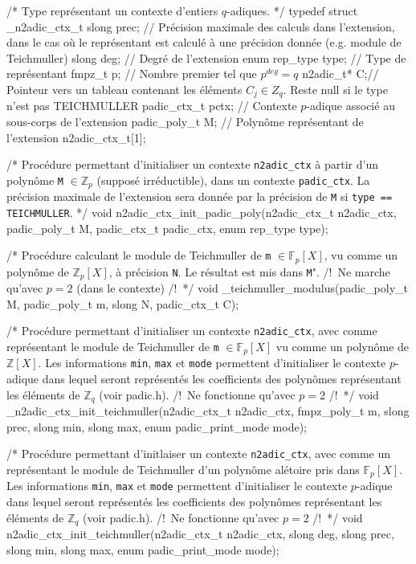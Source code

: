 \documentclass[11pt]{article}
\begin{document}
/* Type représentant un contexte d'entiers $q$-adiques. */
typedef struct _n2adic_ctx_t
{
    slong prec; // Précision maximale des calculs dans l'extension, dans le cas où le représentant est calculé à une précision donnée (e.g. module de Teichmuller)
    slong deg; // Degré de l'extension
    enum rep_type type; // Type de représentant
    fmpz_t p; // Nombre premier tel que $p^{deg} = q$
    n2adic_t* C;// Pointeur vers un tableau contenant les éléments $C_j \in Z_q$. Reste null si le type n'est pas TEICHMULLER
    padic_ctx_t pctx; // Contexte $p$-adique associé au sous-corps de l'extension
    padic_poly_t M; // Polynôme représentant de l'extension
} n2adic_ctx_t[1];

/* Procédure permettant d'initialiser un contexte \texttt{n2adic_ctx} à partir d'un polynôme \texttt{M} $\in \mathbb{Z}_p$ (supposé irréductible), dans un contexte \texttt{padic_ctx}. La précision maximale de l'extension sera donnée par la précision de \texttt{M} si \texttt{type == TEICHMULLER}. */
void n2adic_ctx_init_padic_poly(n2adic_ctx_t n2adic_ctx, padic_poly_t M, padic_ctx_t padic_ctx, enum rep_type type);

/* Procédure calculant le module de Teichmuller de \texttt{m} $\in \mathbb{F}_p[X]$, vu comme un polynôme de $\mathbb{Z}_p[X]$, à précision \texttt{N}. Le résultat est mis dans \texttt{M}". /!\ Ne marche qu'avec $p = 2$ (dans le contexte) /!\ */
void _teichmuller_modulus(padic_poly_t M, padic_poly_t m, slong N, padic_ctx_t C);

/* Procédure permettant d'initialiser un contexte \texttt{n2adic_ctx}, avec comme représentant le module de Teichmuller de \texttt{m} $\in \mathbb{F}_p[X]$ vu comme un polynôme de $\mathbb{Z}[X]$. Les informations \texttt{min}, \texttt{max} et \texttt{mode} permettent d'initialiser le contexte $p$-adique dans lequel seront représentés les coefficients des polynômes représentant les éléments de $\mathbb{Z}_q$ (voir padic.h). /!\ Ne fonctionne qu'avec $p = 2$ /!\  */
void _n2adic_ctx_init_teichmuller(n2adic_ctx_t n2adic_ctx, fmpz_poly_t m, slong prec, slong min, slong max, enum padic_print_mode mode);

/* Procédure permettant d'initlaiser un contexte \texttt{n2adic_ctx}, avec comme un représentant le module de Teichmuller d'un polynôme alétoire pris dans $\mathbb{F}_p[X]$. Les informations \texttt{min}, \texttt{max} et \texttt{mode} permettent d'initialiser le contexte $p$-adique dans lequel seront représentés les coefficients des polynômes représentant les éléments de $\mathbb{Z}_q$ (voir padic.h). /!\ Ne fonctionne qu'avec $p = 2$ /!\ */
void n2adic_ctx_init_teichmuller(n2adic_ctx_t n2adic_ctx, slong deg, slong prec, slong min, slong max, enum padic_print_mode mode);
\end{document}
